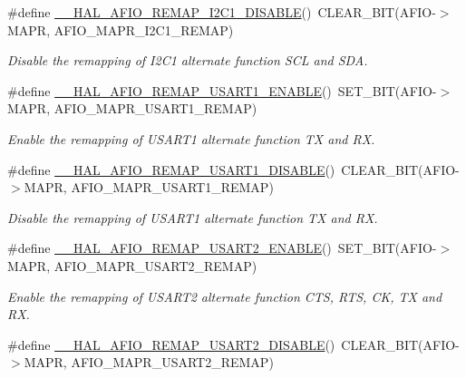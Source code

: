 \begin{DoxyCompactItemize}
\#define \hyperlink{group___g_p_i_o_ex___a_f_i_o___a_f___r_e_m_a_p_p_i_n_g_gaec219c2e592b079df38e12bb793de5e5}{\+\_\+\+\_\+\+H\+A\+L\+\_\+\+A\+F\+I\+O\+\_\+\+R\+E\+M\+A\+P\+\_\+\+I2\+C1\+\_\+\+D\+I\+S\+A\+B\+LE}()~C\+L\+E\+A\+R\+\_\+\+B\+IT(A\+F\+IO-\/$>$M\+A\+PR, A\+F\+I\+O\+\_\+\+M\+A\+P\+R\+\_\+\+I2\+C1\+\_\+\+R\+E\+M\+AP)
\begin{DoxyCompactList}\small\item\em Disable the remapping of I2\+C1 alternate function S\+CL and S\+DA. \end{DoxyCompactList}\item 
\#define \hyperlink{group___g_p_i_o_ex___a_f_i_o___a_f___r_e_m_a_p_p_i_n_g_ga19df3a1377356ba59a8abc04bcf2b859}{\+\_\+\+\_\+\+H\+A\+L\+\_\+\+A\+F\+I\+O\+\_\+\+R\+E\+M\+A\+P\+\_\+\+U\+S\+A\+R\+T1\+\_\+\+E\+N\+A\+B\+LE}()~S\+E\+T\+\_\+\+B\+IT(A\+F\+IO-\/$>$M\+A\+PR, A\+F\+I\+O\+\_\+\+M\+A\+P\+R\+\_\+\+U\+S\+A\+R\+T1\+\_\+\+R\+E\+M\+AP)
\begin{DoxyCompactList}\small\item\em Enable the remapping of U\+S\+A\+R\+T1 alternate function TX and RX. \end{DoxyCompactList}\item 
\#define \hyperlink{group___g_p_i_o_ex___a_f_i_o___a_f___r_e_m_a_p_p_i_n_g_ga5fd5cd3f1f121c8c310f6b1a390b7b51}{\+\_\+\+\_\+\+H\+A\+L\+\_\+\+A\+F\+I\+O\+\_\+\+R\+E\+M\+A\+P\+\_\+\+U\+S\+A\+R\+T1\+\_\+\+D\+I\+S\+A\+B\+LE}()~C\+L\+E\+A\+R\+\_\+\+B\+IT(A\+F\+IO-\/$>$M\+A\+PR, A\+F\+I\+O\+\_\+\+M\+A\+P\+R\+\_\+\+U\+S\+A\+R\+T1\+\_\+\+R\+E\+M\+AP)
\begin{DoxyCompactList}\small\item\em Disable the remapping of U\+S\+A\+R\+T1 alternate function TX and RX. \end{DoxyCompactList}\item 
\#define \hyperlink{group___g_p_i_o_ex___a_f_i_o___a_f___r_e_m_a_p_p_i_n_g_gaed981d1451f0a7514a57d9d7a90fba04}{\+\_\+\+\_\+\+H\+A\+L\+\_\+\+A\+F\+I\+O\+\_\+\+R\+E\+M\+A\+P\+\_\+\+U\+S\+A\+R\+T2\+\_\+\+E\+N\+A\+B\+LE}()~S\+E\+T\+\_\+\+B\+IT(A\+F\+IO-\/$>$M\+A\+PR, A\+F\+I\+O\+\_\+\+M\+A\+P\+R\+\_\+\+U\+S\+A\+R\+T2\+\_\+\+R\+E\+M\+AP)
\begin{DoxyCompactList}\small\item\em Enable the remapping of U\+S\+A\+R\+T2 alternate function C\+TS, R\+TS, CK, TX and RX. \end{DoxyCompactList}\item 
\#define \hyperlink{group___g_p_i_o_ex___a_f_i_o___a_f___r_e_m_a_p_p_i_n_g_gaf72cbf8c2a79923d868d1203b8c133f4}{\+\_\+\+\_\+\+H\+A\+L\+\_\+\+A\+F\+I\+O\+\_\+\+R\+E\+M\+A\+P\+\_\+\+U\+S\+A\+R\+T2\+\_\+\+D\+I\+S\+A\+B\+LE}()~C\+L\+E\+A\+R\+\_\+\+B\+IT(A\+F\+IO-\/$>$M\+A\+PR, A\+F\+I\+O\+\_\+\+M\+A\+P\+R\+\_\+\+U\+S\+A\+R\+T2\+\_\+\+R\+E\+M\+AP)

\end{DoxyCompactItemize}
